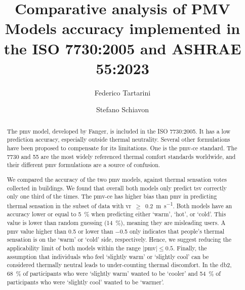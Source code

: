 \begin{frontmatter}

    \title{Comparative analysis of PMV Models accuracy implemented in the ISO 7730:2005 and ASHRAE 55:2023}

    \author[label1]{Federico Tartarini}
    \author[label3]{Stefano Schiavon}

    \address[label1]{School of Architecture, Design, and Planning, The University of Sydney, Sydney, AU}
    \address[label3]{Center for the Built Environment, Department of Architecture, Department of Civil and Environmental Engineering, University of California, Berkeley, CA, USA}


    \begin{abstract}
        The \ac{pmv} model, developed by Fanger, is included in the ISO 7730:2005.
        It has a low prediction accuracy, especially outside thermal neutrality.
        Several other formulations have been proposed to compensate for its limitations.
        One is the \ac{pmv-ce} standard.
        The \gls{7730} and \gls{55} are the most widely referenced thermal comfort standards worldwide, and their different \ac{pmv} formulations are a source of confusion.

        We compared the accuracy of the two \ac{pmv} models, against  thermal sensation votes collected in buildings.
        We found that overall both models only predict \ac{tsv} correctly only one third of the times.
        The \ac{pmv-ce} has higher bias than \ac{pmv} in predicting thermal sensation in the subset of data with \acl{vr}~$\geq$~\qty{0.2}{\m\per\s}.
        Both models have an accuracy lower or equal to \qty{5}{\percent} when predicting either `warm', `hot', or `cold'.
        This value is lower than random guessing (\qty{14}{\percent}), meaning they are misleading users.
        A \ac{pmv} value higher than \num{.5} or lower than \num{-.5} only indicates that people's thermal sensation is on the `warm' or `cold' side, respectively.
        Hence, we suggest reducing the applicability limit of both models within the range $\mid$\ac{pmv}$\mid \leq 0.5$.
        Finally, the assumption that individuals who feel `slightly warm' or `slightly cool' can be considered thermally neutral leads to under-counting thermal discomfort.
        In the \acl{db2}, \qty{68}{\percent} of participants who were `slightly warm' wanted to be `cooler' and \qty{54}{\percent} of participants who were `slightly cool' wanted to be `warmer'.
    \end{abstract}


\end{frontmatter}
